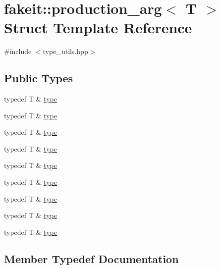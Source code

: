 \hypertarget{structfakeit_1_1production__arg}{}\section{fakeit\+::production\+\_\+arg$<$ T $>$ Struct Template Reference}
\label{structfakeit_1_1production__arg}


{\ttfamily \#include $<$type\+\_\+utils.\+hpp$>$}

\subsection*{Public Types}
\begin{DoxyCompactItemize}
\item 
typedef T \& \mbox{\hyperlink{structfakeit_1_1production__arg_ade8b93fd6a2ff964755def8e4f87e69d}{type}}
\item 
typedef T \& \mbox{\hyperlink{structfakeit_1_1production__arg_ade8b93fd6a2ff964755def8e4f87e69d}{type}}
\item 
typedef T \& \mbox{\hyperlink{structfakeit_1_1production__arg_ade8b93fd6a2ff964755def8e4f87e69d}{type}}
\item 
typedef T \& \mbox{\hyperlink{structfakeit_1_1production__arg_ade8b93fd6a2ff964755def8e4f87e69d}{type}}
\item 
typedef T \& \mbox{\hyperlink{structfakeit_1_1production__arg_ade8b93fd6a2ff964755def8e4f87e69d}{type}}
\item 
typedef T \& \mbox{\hyperlink{structfakeit_1_1production__arg_ade8b93fd6a2ff964755def8e4f87e69d}{type}}
\item 
typedef T \& \mbox{\hyperlink{structfakeit_1_1production__arg_ade8b93fd6a2ff964755def8e4f87e69d}{type}}
\item 
typedef T \& \mbox{\hyperlink{structfakeit_1_1production__arg_ade8b93fd6a2ff964755def8e4f87e69d}{type}}
\item 
typedef T \& \mbox{\hyperlink{structfakeit_1_1production__arg_ade8b93fd6a2ff964755def8e4f87e69d}{type}}
\end{DoxyCompactItemize}


\subsection{Member Typedef Documentation}
\mbox{\label{structfakeit_1_1production__arg_ade8b93fd6a2ff964755def8e4f87e69d}} 
